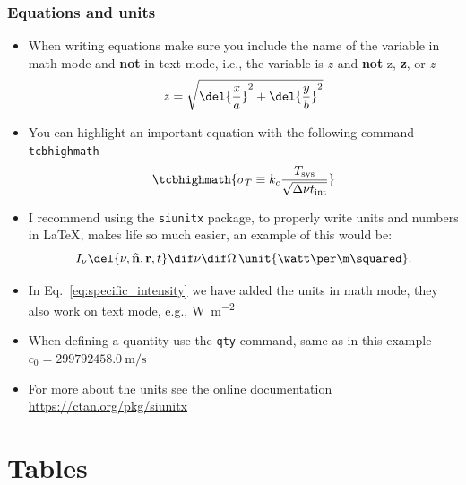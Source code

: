 \documentclass[
    10pt,
    aspectratio=169,
    xcolor={dvipsnames},
    spanish,
    ]{beamer}
\begin{document}
\begin{frame}
  \frametitle{Equations and units}
  \small
  \begin{itemize}
    \item When writing equations make sure you include the name of the variable in math mode and \textbf{not} in text mode, i.e., the variable is $z$ and \textbf{not} z, \textbf{z}, or \textit{z}
    \begin{equation}
      z = \sqrt{\del{\frac{x}{a}}^2 + \del{\frac{y}{b}}^2}
    \end{equation}
    \item You can highlight an important equation with the following command \texttt{tcbhighmath}
    \begin{equation}
      \tcbhighmath{\sigma_T \equiv k_c \frac{T_\text{sys}}{\sqrt{\Delta\nu t_\text{int}}}}
    \end{equation}
    \item I recommend using the \texttt{siunitx} package, to properly write units and numbers in \LaTeX, makes life so much easier, an example of this would be:
    \begin{equation}
        I_\nu\del{\nu,\widehat{\mathbf{n}}, \mathbf{r}, t}\dif\nu\dif\Omega \, \unit{\watt\per\m\squared}.
        \label{eq:specific_intensity}
    \end{equation}
    \item In Eq.~\eqref{eq:specific_intensity} we have added the units in math mode, they also work on text mode, e.g., \unit{\watt\per\m\squared}
    \item When defining a quantity use the \texttt{qty} command, same as in this example $c_0 = \qty{299792458.0}{\m\per\s}$
    \item For more about the units see the online documentation \url{https://ctan.org/pkg/siunitx}
  \end{itemize}
\end{frame}

\section{Tables}
\end{document}
